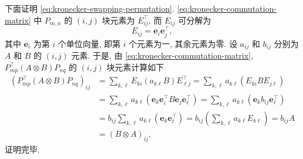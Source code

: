\begin{Proof}
{下面证明 \eqref{eq:kronecker-swapping-permutation}. \eqref{eq:kronecker-commutation-matrix} 中 $P_{m,n}$ 的 $(i,j)$ 块元素为 $E_{ij}^{\top}$, 而 $E_{ij}$ 可分解为}
\[E_{ij}=\boldsymbol{e}_i\boldsymbol{e}_j^{\top},\]
{其中 $\boldsymbol{e}_i$ 为第 $i$ 个单位向量, 即第 $i$ 个元素为一, 其余元素为零. 设 $a_{ij}$ 和 $b_{ij}$ 分别为 $A$ 和 $B$ 的 $(i,j)$ 元素. 于是, 由 \eqref{eq:kronecker-commutation-matrix}, $P_{mp}^{\top}(A\otimes B)P_{nq}$ 的 $(i,j)$ 块元素计算如下}
\[\begin{aligned}
\left(P_{mp}^{\top}(A\otimes B)P_{nq}\right)_{ij}
&=\sum_{k,\ell}E_{ki}(a_{k\ell}B)E_{\ell j}^{\top}=\sum_{k,\ell}a_{k\ell}\left(E_{ki}BE_{j\ell}\right)\\
&=\sum_{k,\ell}a_{k\ell}\left(\boldsymbol{e}_k\boldsymbol{e}_i^{\top}B\boldsymbol{e}_j\boldsymbol{e}_\ell^{\top}\right)
=\sum_{k,\ell}a_{k\ell}\left(\boldsymbol{e}_kb_{ij}\boldsymbol{e}_\ell^{\top}\right)\\
&=b_{ij}\sum_{k,\ell}a_{k\ell}\left(\boldsymbol{e}_k\boldsymbol{e}_\ell^{\top}\right)
=b_{ij}\left(\sum_{k,\ell}a_{k\ell}E_{k\ell}\right)=b_{ij}A\\
&=(B\otimes A)_{ij},
\end{aligned}\]
{证明完毕.}
\end{Proof}
